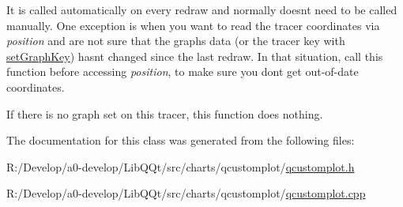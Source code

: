 It is called automatically on every redraw and normally doesn\textquotesingle{}t need to be called manually. One exception is when you want to read the tracer coordinates via {\itshape position} and are not sure that the graph\textquotesingle{}s data (or the tracer key with \mbox{\hyperlink{class_q_c_p_item_tracer_a6840143b42f3b685cedf7c6d83a704c8}{set\+Graph\+Key}}) hasn\textquotesingle{}t changed since the last redraw. In that situation, call this function before accessing {\itshape position}, to make sure you don\textquotesingle{}t get out-\/of-\/date coordinates.

If there is no graph set on this tracer, this function does nothing. 

The documentation for this class was generated from the following files\+:\begin{DoxyCompactItemize}
\item 
R\+:/\+Develop/a0-\/develop/\+Lib\+Q\+Qt/src/charts/qcustomplot/\mbox{\hyperlink{qcustomplot_8h}{qcustomplot.\+h}}\item 
R\+:/\+Develop/a0-\/develop/\+Lib\+Q\+Qt/src/charts/qcustomplot/\mbox{\hyperlink{qcustomplot_8cpp}{qcustomplot.\+cpp}}\end{DoxyCompactItemize}
